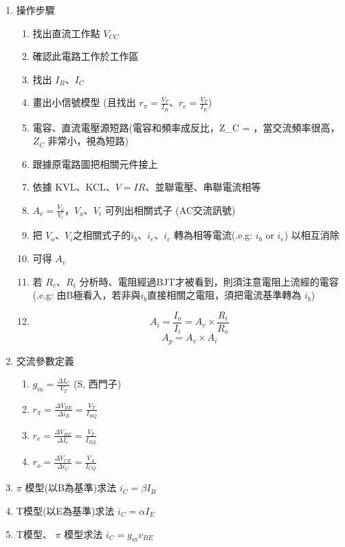 \documentclass[
]{report}
\providecommand{\tightlist}{%
  \setlength{\itemsep}{0pt}\setlength{\parskip}{0pt}}
\begin{document}
\begin{enumerate}
\def\labelenumi{\arabic{enumi}.}
\tightlist
\item
  操作步驟

  \begin{enumerate}
  \def\labelenumii{\arabic{enumii}.}
  \tightlist
  \item
    找出直流工作點 \(V_{CC}\)
  \item
    確認此電路工作於工作區
  \item
    找出 \(I_B\)、\(I_C\)
  \item
    畫出小信號模型 (且找出
    \(r_{\pi} = \frac{V_T}{I_B}\)、\(r_e = \frac{V_T}{I_E}\))
  \item
    電容、直流電壓源短路(電容和頻率成反比，Z\_C =
    ，當交流頻率很高，\(Z_C\) 非常小，視為短路)
  \item
    跟據原電路圖把相關元件接上
  \item
    依據 KVL、KCL、\(V=IR\)、並聯電壓、串聯電流相等
  \item
    \(A_v = \frac{V_o}{V_i}\)，\(V_o\)、\(V_i\) 可列出相關式子
    (AC交流訊號)
  \item
    把 \(V_o\)、\(V_i\)之相關式子的\(i_b\)、\(i_e\)、\(i_c\)
    轉為相等電流(.e.g: \(i_b\) or \(i_e\)) 以相互消除
  \item
    可得 \(A_v\)
  \item
    若 \(R_c\)、\(R_i\)
    分析時、電阻經過BJT才被看到，則須注意電阻上流經的電容(.e.g:
    由B極看入，若非與\(i_b\)直接相關之電阻，須把電流基準轉為 \(i_b\))
  \item
    \[
    A_i = \frac{I_o}{I_i} = A_v \times \frac{R_i}{R_o}
    \] \[
    A_p = A_v \times A_i
    \]
  \end{enumerate}
\item
  交流參數定義

  \begin{enumerate}
  \def\labelenumii{\arabic{enumii}.}
  \tightlist
  \item
    \(g_m = \frac{\Delta I_C}{V_T}\) (S, 西門子)
  \item
    \(r_{\pi} = \frac{\Delta V_{BE}}{\Delta i_B} = \frac{V_T}{I_{BQ}}\)
  \item
    \(r_e = \frac{\Delta V_{BE}}{\Delta I_e} = \frac{V_T}{I_{EQ}}\)
  \item
    \(r_o = \frac{\Delta V_{CE}}{\Delta i_C} = \frac{V_A}{I_{CQ}}\)
  \end{enumerate}
\item
  \(\pi\) 模型(以B為基準)求法 \(i_C = \beta I_B\)
\item
  T模型(以E為基準)求法 \(i_C = \alpha I_E\)
\item
  T模型、 \(\pi\) 模型求法 \(i_C = g_m v_{BE}\)
\end{enumerate}
\end{document}
